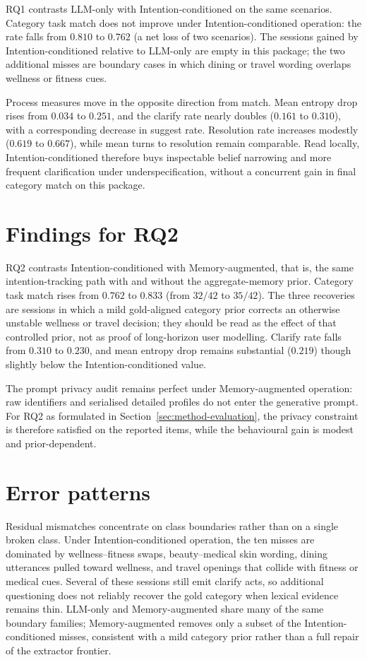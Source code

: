 RQ1 contrasts LLM-only with Intention-conditioned on the same scenarios.
Category task match does not improve under Intention-conditioned operation: the rate falls from $0.810$ to $0.762$ (a net loss of two scenarios).
The sessions gained by Intention-conditioned relative to LLM-only are empty in this package; the two additional misses are boundary cases in which dining or travel wording overlaps wellness or fitness cues.

Process measures move in the opposite direction from match.
Mean entropy drop rises from $0.034$ to $0.251$, and the clarify rate nearly doubles ($0.161$ to $0.310$), with a corresponding decrease in suggest rate.
Resolution rate increases modestly ($0.619$ to $0.667$), while mean turns to resolution remain comparable.
Read locally, Intention-conditioned therefore buys inspectable belief narrowing and more frequent clarification under underspecification, without a concurrent gain in final category match on this package.

\section{Findings for RQ2}
\label{sec:results-rq2}

RQ2 contrasts Intention-conditioned with Memory-augmented, that is, the same intention-tracking path with and without the aggregate-memory prior.
Category task match rises from $0.762$ to $0.833$ (from $32/42$ to $35/42$).
The three recoveries are sessions in which a mild gold-aligned category prior corrects an otherwise unstable wellness or travel decision; they should be read as the effect of that controlled prior, not as proof of long-horizon user modelling.
Clarify rate falls from $0.310$ to $0.230$, and mean entropy drop remains substantial ($0.219$) though slightly below the Intention-conditioned value.

The prompt privacy audit remains perfect under Memory-augmented operation: raw identifiers and serialised detailed profiles do not enter the generative prompt.
For RQ2 as formulated in Section~\ref{sec:method-evaluation}, the privacy constraint is therefore satisfied on the reported items, while the behavioural gain is modest and prior-dependent.

\section{Error patterns}
\label{sec:results-errors}

Residual mismatches concentrate on class boundaries rather than on a single broken class.
Under Intention-conditioned operation, the ten misses are dominated by wellness--fitness swaps, beauty--medical skin wording, dining utterances pulled toward wellness, and travel openings that collide with fitness or medical cues.
Several of these sessions still emit clarify acts, so additional questioning does not reliably recover the gold category when lexical evidence remains thin.
LLM-only and Memory-augmented share many of the same boundary families; Memory-augmented removes only a subset of the Intention-conditioned misses, consistent with a mild category prior rather than a full repair of the extractor frontier.
